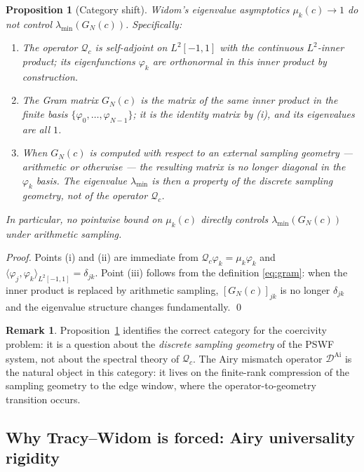 \documentclass[12pt,a4paper]{amsart}
\newtheorem{proposition}[theorem]{Proposition}
\theoremstyle{definition}
\newtheorem{remark}[theorem]{Remark}
\newcommand{\DAi}{\mathcal{D}^{\mathrm{Ai}}}
\begin{document}
\begin{proposition}[Category shift]\label{prop:category}
Widom's eigenvalue asymptotics $\mu_k(c) \to 1$ do not control
$\lambda_{\min}(G_N(c))$.
Specifically:
\begin{enumerate}[\rm (i)]
  \item The operator $\mathcal{Q}_c$ is self-adjoint on $L^2[-1,1]$
    with the \emph{continuous} $L^2$-inner product; its eigenfunctions
    $\varphi_k$ are orthonormal in this inner product by construction.
  \item The Gram matrix $G_N(c)$ is the matrix of the
    \emph{same} inner product in the \emph{finite} basis
    $\{\varphi_0,\ldots,\varphi_{N-1}\}$; it is the identity matrix
    by (i), and its eigenvalues are all $1$.
  \item When $G_N(c)$ is computed with respect to an \emph{external}
    sampling geometry --- arithmetic or otherwise --- the resulting
    matrix is no longer diagonal in the $\varphi_k$ basis.
    The eigenvalue $\lambda_{\min}$ is then a property of the
    \emph{discrete sampling geometry}, not of the operator $\mathcal{Q}_c$.
\end{enumerate}
In particular, no pointwise bound on $\mu_k(c)$ directly controls
$\lambda_{\min}(G_N(c))$ under arithmetic sampling.
\end{proposition}

\begin{proof}
Points (i) and (ii) are immediate from $\mathcal{Q}_c\varphi_k = \mu_k\varphi_k$
and $\langle\varphi_j,\varphi_k\rangle_{L^2[-1,1]} = \delta_{jk}$.
Point (iii) follows from the definition \eqref{eq:gram}: when the inner
product is replaced by arithmetic sampling, $[G_N(c)]_{jk}$
is no longer $\delta_{jk}$ and the eigenvalue structure changes
fundamentally. \qed
\end{proof}

\begin{remark}
Proposition~\ref{prop:category} identifies the correct category for
the coercivity problem: it is a question about the \emph{discrete
sampling geometry} of the PSWF system, not about the spectral
theory of $\mathcal{Q}_c$.
The Airy mismatch operator $\DAi$ is the natural object
in this category: it lives on the finite-rank compression of the
sampling geometry to the edge window, where the operator-to-geometry
transition occurs.
\end{remark}

\subsection{Why Tracy--Widom is forced: Airy universality rigidity}\label{ssec:tw_forced}
\end{document}

